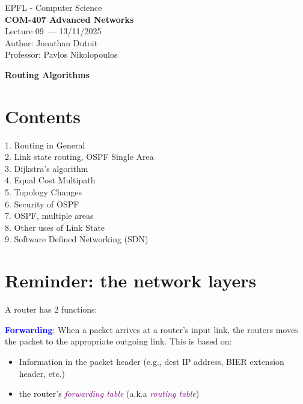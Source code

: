 \documentclass[11pt]{article}
\newcommand{\coursename}{COM-407 Advanced Networks}
\newcommand{\lecturenum}{09}
\newcommand{\lecturedate}{13/11/2025}
\newcommand{\professor}{Pavlos Nikolopoulos}
\begin{document}
\begin{center}
  {\large EPFL - Computer Science} \\[0.5em]
  {\Large \textbf{\coursename}} \\[0.5em]
  {\large Lecture \lecturenum\ --- \lecturedate} \\[0.5em]
  {\large Author: Jonathan Dutoit} \\[0.5em]
  {\large Professor: \professor} \\[0.5em]
\end{center}

\vspace{2cm}

\begin{center}
  {\LARGE \textbf{Routing Algorithms}}
\end{center}

\vspace{1cm}

\section*{Contents}

1. Routing in General \\
2. Link state routing, OSPF Single Area \\
3. Dijkstra's algorithm \\
4. Equal Cost Multipath \\
5. Topology Changes \\
6. Security of OSPF \\
7. OSPF, multiple areas \\
8. Other uses of Link State \\
9. Software Defined Networking (SDN)

\section*{Reminder: the network layers}

A router has 2 functions:

\textbf{\textcolor{blue}{Forwarding}}: When a packet arrives at a router's input link, the routers moves the packet to the appropriate outgoing link. This is based on: 
\begin{itemize}
	\item Information in the packet header (e.g., dest IP address, BIER extension header, etc.)
	\item the router's \textcolor{purple}{\textit{forwarding table}} (a.k.a \textcolor{purple}{\textit{routing table}})
\end{itemize}
\end{document}
